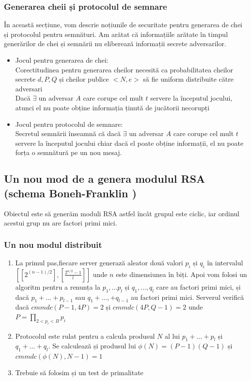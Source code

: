 \documentclass[12pt, oneside]{book}
\begin{document}
\subsubsection{Generarea cheii și protocolul de semnare}
În această secțiune, vom descrie noțiunile de securitate pentru generarea de chei și protocolul pentru semnături. Am arătat că informațiile arătate în timpul generărilor de chei și semnării nu eliberează informații secrete adversarilor.
\begin{itemize}
\item Jocul pentru generarea de chei: \\
Corectitudinea pentru generarea cheilor necesită ca probabilitatea cheilor secrete $d, P, Q$ și cheilor publice $<N,e>$ să fie uniform distribuite către adversari \\ 
Dacă $\exists$ un adversar $A$ care corupe cel mult $t$ servere la începutul jocului, atunci el nu poate obține informația ținută de jucătorii necorupți

\item Jocul pentru protocolul de semnare: \\
Secretul semnării înseamnă că dacă $\exists$ un adversar $A$ care corupe cel mult $t$ servere la începutul jocului chiar dacă el poate obține informații, el nu poate forța o semnătură pe un nou mesaj.
\end{itemize}


\subsection{Un nou mod de a genera modulul RSA (schema Boneh-Franklin \cite{boneh})}
Obiectul este să generăm moduli RSA astfel încât grupul este ciclic, iar ordinul acestui grup nu are factori primi mici.
\subsubsection{Un nou modul distribuit}
\begin{enumerate}

\item La primul pas,fiecare server generază aleator două valori $p_i$ și $q_i$ în intervalul $ \left[ [2^{(n-1)/2}], [\frac{2^{n/2}-1}{l}] \right]$ unde $n$ este dimensiunea în biți. Apoi vom folosi un algoritm pentru a renunța la $p_1, \dots p_l$ și $q_1, \dots ,q_l$ care au factori primi mici, și dacă $p_1+ \dots +p_{l-1}$ sau $q_1+ \dots ,+q_{l-1}$ au factori primi mici. Serverul verifică dacă $cmmdc(P-1,4P)=2$ și $cmmdc(4P,Q-1)=2$ unde $P = \prod_{2 <p_i < B} p_i$

\item Protocolul este rulat pentru a calcula produsul $N$ al lui $p_1+ \dots +p_l$ și $q_1+ \dots +q_l$. Se calculează și produsul lui $\phi(N)=(P-1)(Q-1)$ și $cmmdc(\phi(N),N-1)=1$

\item Trebuie să folosim și un test de primalitate
\end{enumerate}
\end{document}
